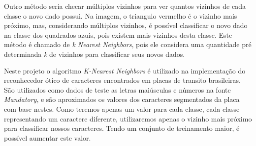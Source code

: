 Outro método seria checar múltiplos vizinhos para ver quantos vizinhos de cada classe o novo dado possui. Na imagem, o triangulo vermelho é o vizinho mais próximo, mas, considerando múltiplos vizinhos, é possível classificar o novo dado na classe dos quadrados azuis, pois existem mais vizinhos desta classe. Este método é chamado de \emph{k Nearest Neighbors}, pois ele considera uma quantidade pré determinada \emph{k} de vizinhos para classificar seus novos dados. ~\cite{opencv2014knearest}

Neste projeto o algoritmo \emph{K-Nearest Neighbors} é utilizado na implementação do reconhecedor ótico de caracteres encontrados em placas de transito brasileiras. São utilizados como dados de teste as letras maiúsculas e números na fonte \emph{Mandatory}, e são aproximados os valores dos caracteres segmentados da placa com base nestes. Como teremos apenas um valor para cada classe, cada classe representando um caractere diferente, utilizaremos apenas o vizinho mais próximo para classificar nossos caracteres. Tendo um conjunto de treinamento maior, é possível aumentar este valor.
 